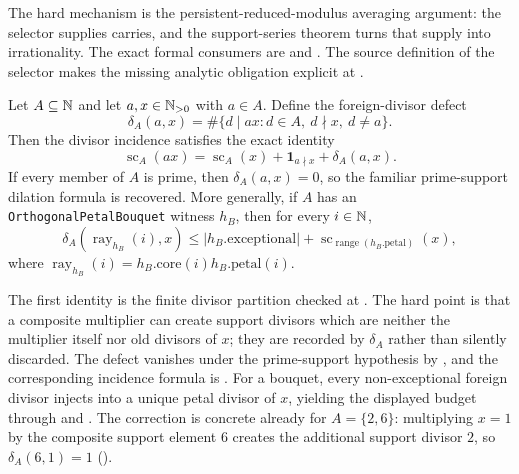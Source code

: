 \documentclass[11pt]{article}
\newcommand{\scA}{\operatorname{sc}}
\begin{document}
\noindent The hard mechanism is the persistent-reduced-modulus averaging
argument: the selector supplies carries, and the support-series theorem
turns that supply into irrationality.  The exact formal consumers are
and
.
The source definition of the selector makes the missing analytic obligation
explicit at
.

\begin{theorem}
\label{res:compositedefect}
Let $A\subseteq\mathbb{N}$ and let $a,x\in\mathbb{N}_{>0}$ with $a\in A$.  Define the foreign-divisor
defect
\[
  \delta_A(a,x)=\#\{d\mid ax:d\in A,\ d\nmid x,\ d\ne a\}.
\]
Then the divisor incidence satisfies the exact identity
\[
  \scA_A(ax)=\scA_A(x)+\mathbf 1_{a\nmid x}+\delta_A(a,x).
\]
If every member of $A$ is prime, then $\delta_A(a,x)=0$, so the familiar
prime-support dilation formula is recovered.  More generally, if $A$ has an
\texttt{OrthogonalPetalBouquet} witness $h_B$, then for every $i\in\mathbb{N}$,
\[
  \delta_A(\operatorname{ray}_{h_B}(i),x)\le
  |h_B.\mathrm{exceptional}|+
  \scA_{\operatorname{range}(h_B.\mathrm{petal})}(x),
\]
where $\operatorname{ray}_{h_B}(i)=h_B.\mathrm{core}(i)h_B.\mathrm{petal}(i)$.
\end{theorem}

\noindent The first identity is the finite divisor partition checked at
.
The hard point is that a composite multiplier can create support divisors
which are neither the multiplier itself nor old divisors of $x$; they are
recorded by $\delta_A$ rather than silently discarded.  The defect vanishes
under the prime-support hypothesis by
,
and the corresponding incidence formula is
.
For a bouquet, every non-exceptional foreign divisor injects into a unique
petal divisor of $x$, yielding the displayed budget through
and
.
The correction is concrete already for $A=\{2,6\}$: multiplying $x=1$ by
the composite support element $6$ creates the additional support divisor $2$,
so $\delta_A(6,1)=1$
().
\end{document}
